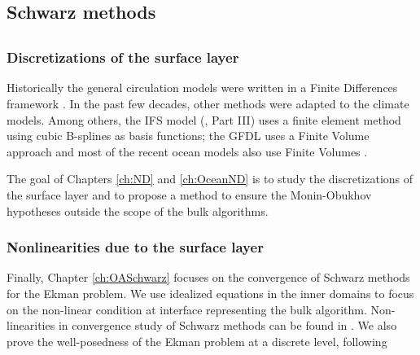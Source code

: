 \subsection{Schwarz methods}
\subsection{}
\subsubsection*{Discretizations of the surface layer}
Historically the general circulation models were written in
a Finite Differences framework \citep{randall_general_2000}. In the
past few decades, other methods were adapted to the
climate models. Among others, the IFS model
(\citep{ecmwf_ifs_2020}, Part III)
uses a finite element method using cubic B-splines as basis
functions;
the GFDL uses a Finite Volume approach
\citep{harris_scientific_2021}
and most of the recent ocean models also use
Finite Volumes \citep{griffies_fundamentals_2005}.
\par
{}
\par
{}
The goal of Chapters \ref{ch:ND} and \ref{ch:OceanND}
is to study the discretizations of the surface layer and
to propose a method to ensure the Monin-Obukhov hypotheses
outside the scope of the bulk algorithms.
\subsubsection*{Nonlinearities due to the surface layer}
Finally, Chapter \ref{ch:OASchwarz} focuses on the convergence
of Schwarz methods for the Ekman problem. We use idealized
equations in the inner domains to focus on the non-linear
condition at interface representing the bulk algorithm.
Non-linearities in convergence study of Schwarz methods
can be found in .
We also prove the well-posedness of the Ekman problem
at a discrete level, following

